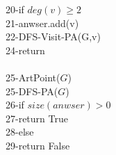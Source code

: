\documentclass{article}
\begin{document}
\begin{algorithm}
        20-\hspace*{4em}if $deg(v)\ge 2$\\
        21-\hspace*{5em}anwser.add(v)\\
        22-\hspace*{4em}DFS-Visit-PA(G,v)\\
        24-\hspace*{2em}return \\\\
        25-\hspace*{1em}ArtPoint($G$)\\
        25-\hspace*{2em}DFS-PA($G$)\\
        26-\hspace*{2em}if $size(anwser) >0$\\
        27-\hspace*{3em}return True\\
        28-\hspace*{2em}else\\
        29-\hspace*{3em}return False\\
        
    \end{algorithm}
\end{document}
